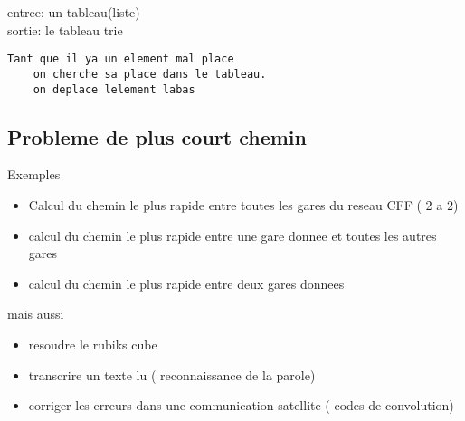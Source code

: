 \documentclass[../main.tex]{subfiles}
\begin{document}
\begin{exemple}
entree: un tableau(liste)\\
sortie: le tableau trie
\begin{lstlisting}
Tant que il ya un element mal place
	on cherche sa place dans le tableau.
	on deplace lelement labas
\end{lstlisting}
\subsection{Probleme de plus court chemin}
Exemples
\begin{itemize}
	\item Calcul du chemin le plus rapide entre toutes les gares du reseau CFF ( 2 a 2)
	\item calcul du chemin le plus rapide entre une gare donnee et toutes les autres gares
	\item calcul du chemin le plus rapide entre deux gares donnees
\end{itemize}
mais aussi
\begin{itemize}
\item resoudre le rubiks cube
\item transcrire un texte lu ( reconnaissance de la parole)
\item corriger les erreurs dans une communication satellite ( codes de convolution)
\end{itemize}



\end{exemple}
\end{document}
